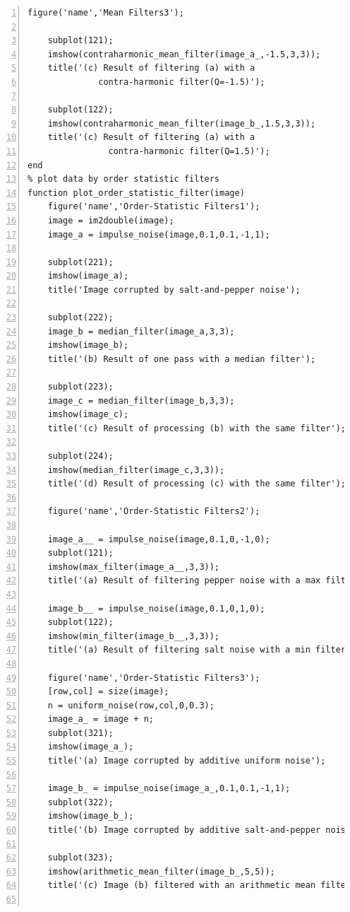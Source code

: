 \documentclass[11pt,oneside]{book}
\begin{document}
\begin{appendices}
\begin{lstlisting}[numbers=left, numberstyle=\tiny,keywordstyle=\color{blue!70},commentstyle=\color{red!50!green!50!blue!50},frame=shadowbox, rulesepcolor=\color{red!20!green!20!blue!20}]
    figure('name','Mean Filters3');
    
    subplot(121);
    imshow(contraharmonic_mean_filter(image_a_,-1.5,3,3));
    title('(c) Result of filtering (a) with a 
              contra-harmonic filter(Q=-1.5)');
    
    subplot(122);
    imshow(contraharmonic_mean_filter(image_b_,1.5,3,3));
    title('(c) Result of filtering (a) with a 
                contra-harmonic filter(Q=1.5)');
end
% plot data by order statistic filters
function plot_order_statistic_filter(image)
    figure('name','Order-Statistic Filters1');
    image = im2double(image);
    image_a = impulse_noise(image,0.1,0.1,-1,1);
    
    subplot(221);
    imshow(image_a);
    title('Image corrupted by salt-and-pepper noise');
    
    subplot(222);
    image_b = median_filter(image_a,3,3);
    imshow(image_b);
    title('(b) Result of one pass with a median filter');
    
    subplot(223);
    image_c = median_filter(image_b,3,3);
    imshow(image_c);
    title('(c) Result of processing (b) with the same filter');
    
    subplot(224);
    imshow(median_filter(image_c,3,3));
    title('(d) Result of processing (c) with the same filter');
    
    figure('name','Order-Statistic Filters2');
    
    image_a__ = impulse_noise(image,0.1,0,-1,0);
    subplot(121);
    imshow(max_filter(image_a__,3,3));
    title('(a) Result of filtering pepper noise with a max filter');
    
    image_b__ = impulse_noise(image,0.1,0,1,0);
    subplot(122);
    imshow(min_filter(image_b__,3,3));
    title('(a) Result of filtering salt noise with a min filter');
    
    figure('name','Order-Statistic Filters3');
    [row,col] = size(image);
    n = uniform_noise(row,col,0,0.3);
    image_a_ = image + n;
    subplot(321);
    imshow(image_a_);
    title('(a) Image corrupted by additive uniform noise');
    
    image_b_ = impulse_noise(image_a_,0.1,0.1,-1,1);
    subplot(322);
    imshow(image_b_);
    title('(b) Image corrupted by additive salt-and-pepper noise');
    
    subplot(323);
    imshow(arithmetic_mean_filter(image_b_,5,5));
    title('(c) Image (b) filtered with an arithmetic mean filter');
    

\end{lstlisting}
\end{appendices}
\end{document}
